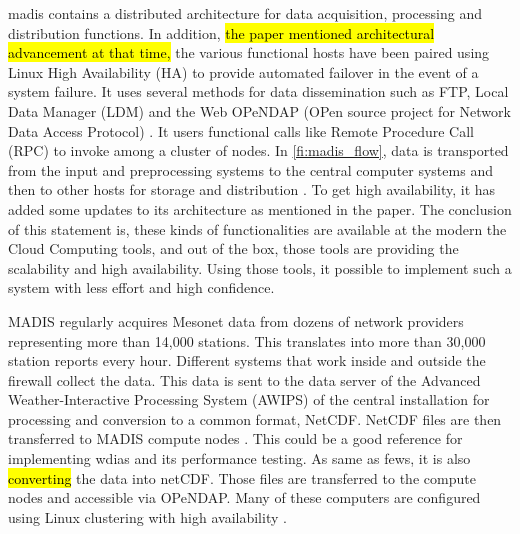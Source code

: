 \acrshort{madis} contains a distributed architecture for data acquisition, processing and distribution functions.
In addition, \hl{the paper mentioned architectural advancement at that time,} the various functional hosts have been paired using Linux High Availability (HA) to provide automated failover in the event of a system failure. It uses several methods for data dissemination such as FTP, Local Data Manager (LDM) and the Web OPeNDAP (OPen source project for Network Data Access Protocol) \cite{Macdermaid2005ArchitectureP2.39}. %
It users functional calls like Remote Procedure Call (RPC) to invoke among a cluster of nodes. In \cref{fi:madis_flow}, data is transported from the input and preprocessing systems to the central computer systems and then to other hosts for storage and distribution \cite{Macdermaid2005ArchitectureP2.39}. To get high availability, it has added some updates to its architecture as mentioned in the paper. The conclusion of this statement is, these kinds of functionalities are available at the modern the Cloud Computing tools, and out of the box, those tools are providing the scalability and high availability. Using those tools, it possible to implement such a system with less effort and high confidence.

MADIS regularly acquires Mesonet data from dozens of network providers representing more than 14,000 stations. This translates into more than 30,000 station reports every hour. Different systems that work inside and outside the firewall collect the data. This data is sent to the data server of the Advanced Weather-Interactive Processing System (AWIPS) of the central installation for processing and conversion to a common format, NetCDF. NetCDF files are then transferred to MADIS compute nodes \cite{Macdermaid2005ArchitectureP2.39}. %
This could be a good reference for implementing \acrshort{wdias} and its performance testing. As same as \acrshort{fews}, it is also \hl{converting} the data into %
\acrshort{netCDF}. Those files are transferred to the compute nodes and accessible via OPeNDAP. 
Many of these computers are configured using Linux clustering with high availability \cite{Macdermaid2005ArchitectureP2.39}.%

